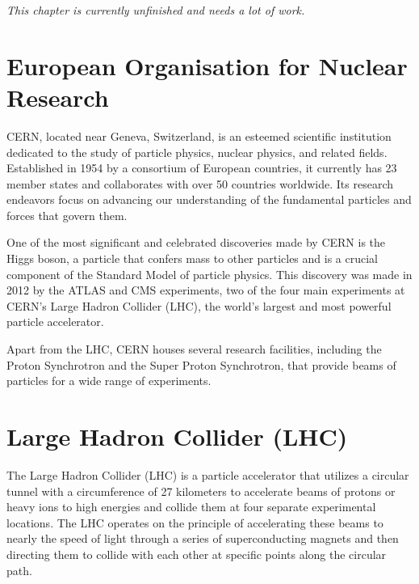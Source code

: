 \def \imgpath {"./figures/lhc"}

\textit{This chapter is currently unfinished and needs a lot of work.}

\section{European Organisation for Nuclear Research}
CERN, located near Geneva, Switzerland, is an esteemed scientific institution dedicated to the study of particle physics, nuclear physics, and related fields. Established in 1954 by a consortium of European countries, it currently has 23 member states and collaborates with over 50 countries worldwide. Its research endeavors focus on advancing our understanding of the fundamental particles and forces that govern them.

One of the most significant and celebrated discoveries made by CERN is the Higgs boson, a particle that confers mass to other particles and is a crucial component of the Standard Model of particle physics. This discovery was made in 2012 by the ATLAS and CMS experiments, two of the four main experiments at CERN's Large Hadron Collider (LHC), the world's largest and most powerful particle accelerator.

Apart from the LHC, CERN houses several research facilities, including the Proton Synchrotron and the Super Proton Synchrotron, that provide beams of particles for a wide range of experiments. %

\section{Large Hadron Collider (LHC)}

The Large Hadron Collider (LHC) is a particle accelerator that utilizes a circular tunnel with a circumference of 27 kilometers to accelerate beams of protons or heavy ions to high energies and collide them at four separate experimental locations. The LHC operates on the principle of accelerating these beams to nearly the speed of light through a series of superconducting magnets and then directing them to collide with each other at specific points along the circular path.

